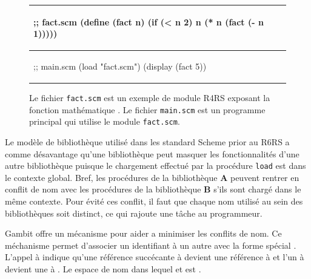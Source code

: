 \begin{figure}[ht]
  \begin{center}
    \begin{tabular}{|l|}
    \hline
    \begin{mplisting}{0.4}
;; fact.scm
(define (fact n)
  (if (< n 2)
    n
    (* n (fact (- n 1)))))
\end{mplisting} \\\hline
    \begin{mplisting}{0.4}
;; main.scm
(load "fact.scm")
(display (fact 5))
\end{mplisting} \\\hline
    \end{tabular}
  \end{center}
  \caption{Le fichier \texttt{fact.scm} est un exemple de module R4RS exposant
  la fonction mathématique . Le fichier \texttt{main.scm} est un
  programme principal qui utilise le module \texttt{fact.scm}.}
  \label{fig:r4rs_fact}
\end{figure}

Le modèle de bibliothèque utilisé dans les standard Scheme prior au
R6RS\cite{Scheme:R6RS} a comme désavantage qu'une bibliothèque peut masquer les
fonctionnalités d'une autre bibliothèque puisque le chargement effectué par la
procédure \texttt{load} est dans le contexte global. Bref, les procédures de la
bibliothèque \textbf{A} peuvent rentrer en conflit de nom avec les procédures
de la bibliothèque \textbf{B} s'ils sont chargé dans le même contexte.  Pour
évité ces conflit, il faut que chaque nom utilisé au sein des bibliothèques
soit distinct, ce qui rajoute une tâche au programmeur.


Gambit offre un mécanisme pour aider a minimiser les conflits de nom. Ce
méchanisme permet d'associer un identifiant à un autre avec la forme spécial
.  L'appel à  indique
qu'une référence succécante à  devient une référence à
 et l'un à  devient une à . Le espace
de nom dans lequel  et  est .

